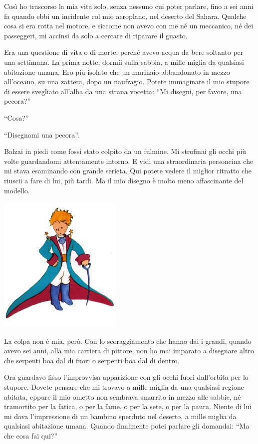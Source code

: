 \documentclass[11pt]{scrbook}
\begin{document}
Così ho trascorso la mia vita solo, senza nessuno cui poter parlare, fino a sei anni fa quando ebbi un incidente col mio aeroplano, nel deserto del Sahara. Qualche cosa si era rotta nel motore, e siccome non avevo con me né un meccanico, né dei passeggeri, mi accinsi da solo a cercare di riparare il guasto.

Era una questione di vita o di morte, perché avevo acqua da bere soltanto per una settimana. La prima notte, dormii sulla sabbia, a mille miglia da qualsiasi abitazione umana. Ero più isolato che un marinaio abbandonato in mezzo all'oceano, su una zattera, dopo un naufragio. Potete immaginare il mio stupore di essere svegliato all'alba da una strana vocetta: ``Mi disegni, per favore, una pecora?''

``Cosa?''

``Disegnami una pecora''.

Balzai in piedi come fossi stato colpito da un fulmine. Mi strofinai gli occhi più volte guardandomi attentamente intorno. E vidi una straordinaria personcina che mi stava esaminando con grande serieta. Qui potete vedere il miglior ritratto che riuscii a fare di lui, più tardi. Ma il mio disegno è molto meno affascinante del modello.

\begin{center}
\includegraphics{img/retrato}
\end{center}

La colpa non è mia, però. Con lo scoraggiamento che hanno dai i grandi, quando avevo sei anni, alla mia carriera di pittore, non ho mai imparato a disegnare altro che serpenti boa dal di fuori o serpenti boa dal di dentro.

Ora guardavo fisso l'improvvisa apparizione con gli occhi fuori dall'orbita per lo stupore. Dovete pensare che mi trovavo a mille miglia da una qualsiasi regione abitata, eppure il mio ometto non sembrava smarrito in mezzo alle sabbie, né tramortito per la fatica, o per la fame, o per la sete, o per la paura. Niente di lui mi dava l'impressione di un bambino sperduto nel deserto, a mille miglia da qualsiasi abitazione umana. Quando finalmente potei parlare gli domandai: ``Ma che cosa fai qui?''
\end{document}
